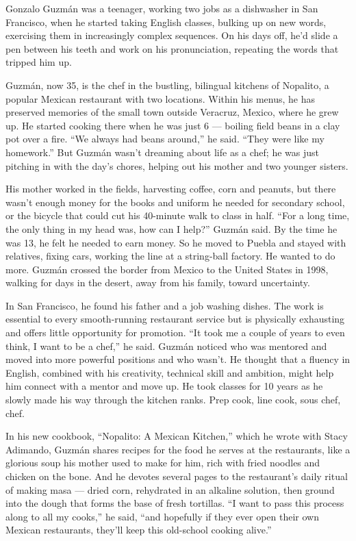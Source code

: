 Gonzalo Guzmán was a teenager, working two jobs as a dishwasher in San
Francisco, when he started taking English classes, bulking up on new
words, exercising them in increasingly complex sequences. On his days
off, he'd slide a pen between his teeth and work on his pronunciation,
repeating the words that tripped him up.

Guzmán, now 35, is the chef in the bustling, bilingual kitchens of
Nopalito, a popular Mexican restaurant with two locations. Within his
menus, he has preserved memories of the small town outside Veracruz,
Mexico, where he grew up. He started cooking there when he was just 6
--- boiling field beans in a clay pot over a fire. ``We always had beans
around,'' he said. ``They were like my homework.'' But Guzmán wasn't
dreaming about life as a chef; he was just pitching in with the day's
chores, helping out his mother and two younger sisters.

His mother worked in the fields, harvesting coffee, corn and peanuts,
but there wasn't enough money for the books and uniform he needed for
secondary school, or the bicycle that could cut his 40-minute walk to
class in half. ``For a long time, the only thing in my head was, how can
I help?'' Guzmán said. By the time he was 13, he felt he needed to earn
money. So he moved to Puebla and stayed with relatives, fixing cars,
working the line at a string-ball factory. He wanted to do more. Guzmán
crossed the border from Mexico to the United States in 1998, walking for
days in the desert, away from his family, toward uncertainty.

In San Francisco, he found his father and a job washing dishes. The work
is essential to every smooth-running restaurant service but is
physically exhausting and offers little opportunity for promotion. ``It
took me a couple of years to even think, I want to be a chef,'' he said.
Guzmán noticed who was mentored and moved into more powerful positions
and who wasn't. He thought that a fluency in English, combined with his
creativity, technical skill and ambition, might help him connect with a
mentor and move up. He took classes for 10 years as he slowly made his
way through the kitchen ranks. Prep cook, line cook, sous chef, chef.

In his new cookbook, ``Nopalito: A Mexican Kitchen,'' which he wrote
with Stacy Adimando, Guzmán shares recipes for the food he serves at the
restaurants, like a glorious soup his mother used to make for him, rich
with fried noodles and chicken on the bone. And he devotes several pages
to the restaurant's daily ritual of making masa --- dried corn,
rehydrated in an alkaline solution, then ground into the dough that
forms the base of fresh tortillas. ``I want to pass this process along
to all my cooks,'' he said, ``and hopefully if they ever open their own
Mexican restaurants, they'll keep this old-school cooking alive.''

